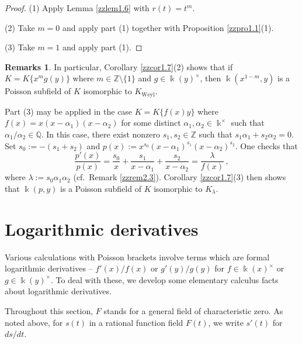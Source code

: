 \documentclass[12pt]{amsart}
\theoremstyle{plain}
\numberwithin{theorem}{section}
\numberwithin{equation}{theorem}
\theoremstyle{definition}
\newtheorem{remarks}[theorem]{Remarks}
\newcommand{\QQ}{\mathbb{Q}}
\newcommand{\ZZ}{\mathbb{Z}}
\DeclareMathOperator{\Weyl}{Weyl}
\newcommand \Kweyl {K_{\Weyl}}
\newcommand \kx {\Bbbk^\times}
\begin{document}
\begin{proof}
(1) Apply Lemma \ref{zzlem1.6} with $r(t) = t^m$.

(2) Take $m=0$ and apply part (1) together with Proposition \ref{zzpro1.1}(1).

(3) Take $m=1$ and apply part (1).
\end{proof}

\begin{remarks}
\label{zzrem1.8}
In particular, Corollary \ref{zzcor1.7}(2) shows that if $K = K\{x^m g(y)\}$ where $m \in \ZZ \setminus \{1\}$ and
$g \in \Bbbk(y)^\times$, then 
$\Bbbk(x^{1-m},y)$ is a Poisson subfield of $K$ isomorphic to 
$\Kweyl$. 

Part (3) may be applied in the case $K = K\{f(x)y\}$ where 
$f(x) = x (x-\alpha_1) (x-\alpha_2)$ for some distinct 
$\alpha_1,\alpha_2 \in \kx$ such that $\alpha_1/\alpha_2 \in \QQ$. 
In this case, there exist nonzero $s_1,s_2 \in \ZZ$ such that 
$s_1\alpha_1 + s_2\alpha_2 = 0$. Set $s_0 := - (s_1+s_2)$ and 
$p(x) := x^{s_0} (x-\alpha_1)^{s_1} (x-\alpha_2)^{s_2}$.  One checks that
$$
\frac{p'(x)}{p(x)} = \frac{s_0}{x} + \frac{s_1}{x-\alpha_1} + \frac{s_2}{x-\alpha_2} = 
\frac\lambda{f(x)} \,,
$$
where $\lambda := s_0 \alpha_1 \alpha_2$ (cf.~Remark \ref{zzrem2.3}). 
Corollary \ref{zzcor1.7}(3) then shows that $\Bbbk(p,y)$ is a 
Poisson subfield of $K$ isomorphic to $K_\lambda$.
\end{remarks}

\section{Logarithmic derivatives}
\label{zzsec2}

Various calculations with Poisson brackets
involve terms which are formal logarithmic
derivatives -- $f'(x)/f(x)$ or $g'(y)/g(y)$ 
for $f \in \Bbbk(x)^\times$ or $g \in 
\Bbbk(y)^\times$.  To deal with these, we
develop some elementary calculus facts 
about logarithmic derivatives.

Throughout this section, $F$ stands for a
general field of characteristic zero. As 
noted above, for $s(t)$ in a rational 
function field $F(t)$, we write $s'(t)$ 
for $ds/dt$.
\end{document}
